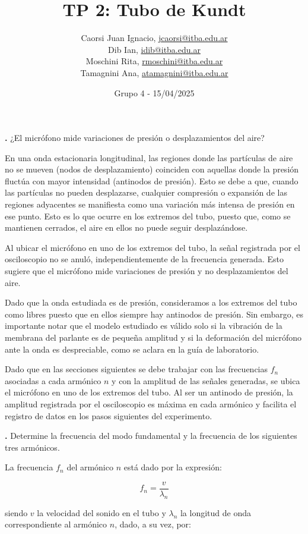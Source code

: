 \documentclass[12pt, a4paper]{article}
\title{TP 2: Tubo de Kundt}
\author
{
  Caorsi Juan Ignacio, \href{jcaorsi@itba.edu.ar}{jcaorsi@itba.edu.ar} \\
  Dib Ian, \href{idib@itba.edu.ar}{idib@itba.edu.ar} \\
  Moschini Rita, \href{rmoschini@itba.edu.ar}{rmoschini@itba.edu.ar} \\
  Tamagnini Ana, \href{atamagnini@itba.edu.ar}{atamagnini@itba.edu.ar}
}
\date{Grupo 4 - 15/04/2025}
\newcounter{step}
\newcommand{\step}[1]
{
  \par\vspace{2ex}
  \stepcounter{step}
  \noindent\textbf{\arabic{step}.} #1\par\vspace{1ex}
}
\begin{document}
\maketitle


\step{¿El micrófono mide variaciones de presión o desplazamientos del aire?}

En una onda estacionaria longitudinal, las regiones donde las partículas de aire no se mueven (nodos de desplazamiento) coinciden con aquellas donde la presión fluctúa con mayor intensidad (antinodos de presión). Esto se debe a que, cuando las partículas no pueden desplazarse, cualquier compresión o expansión de las regiones adyacentes se manifiesta como una variación más intensa de presión en ese punto. Esto es lo que ocurre en los extremos del tubo, puesto que, como se mantienen cerrados, el aire en ellos no puede seguir desplazándose.

Al ubicar el micrófono en uno de los extremos del tubo, la señal registrada por el osciloscopio no se anuló, independientemente de la frecuencia generada. Esto sugiere que el micrófono mide variaciones de presión y no desplazamientos del aire.

Dado que la onda estudiada es de presión, consideramos a los extremos del tubo como libres puesto que en ellos siempre hay antinodos de presión. Sin embargo, es importante notar que el modelo estudiado es válido solo si la vibración de la membrana del parlante es de pequeña amplitud y si la deformación del micrófono ante la onda es despreciable, como se aclara en la guía de laboratorio.

Dado que en las secciones siguientes se debe trabajar con las frecuencias $f_{n}$ asociadas a cada armónico $n$ y con la amplitud de las señales generadas, se ubica el micrófono en uno de los extremos del tubo. Al ser un antinodo de presión, la amplitud registrada por el osciloscopio es máxima en cada armónico y facilita el registro de datos en los pasos siguientes del experimento.


\step{Determine la frecuencia del modo fundamental y la frecuencia de los siguientes tres armónicos.}

La frecuencia $f_{n}$ del armónico $n$ está dado por la expresión:

\begin{equation}
    f_{n} = \frac{v}{\lambda_{n}}
  \label{equation1}
\end{equation}

siendo $v$ la velocidad del sonido en el tubo y $\lambda_{n}$ la longitud de onda correspondiente al armónico $n$, dado, a su vez, por:
\end{document}
